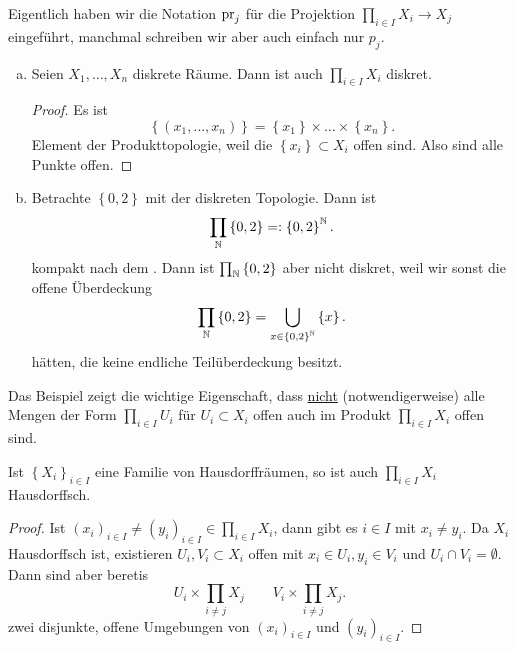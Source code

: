 \begin{remark}
    Eigentlich haben wir die Notation $\operatorname{pr}_j$ für die Projektion  $\prod _{i \in I}X_i \to  X_j$ eingeführt, manchmal schreiben wir aber auch einfach nur $p_j$.
\end{remark}
\begin{example}
    \begin{enumerate}[a)]
        \item Seien $X_1,\ldots,X_n$ diskrete Räume. Dann ist auch $\prod_{i \in I}X_i$ diskret.
            \begin{proof}
                Es ist
                \[
                    \left \{(x_1,\ldots,x_n)\right\}  = \left \{x_1\right\} \times \ldots\times \left \{x_n\right\} 
                .\] 
                Element der Produkttopologie, weil die $\left \{x_i\right\} \subset X_i$ offen sind. Also sind alle Punkte offen.
            \end{proof}
        \item Betrachte $\left \{0,2\right\} $ mit der diskreten Topologie. Dann ist
            \[
            \prod_{\mathbb{N}} \left \{0,2\right\} =: \left \{0,2\right\} ^{\mathbb{N}}
            .\] 
            kompakt nach dem . Dann ist $\prod_{\mathbb{N}} \left \{0,2\right\} $ aber nicht diskret, weil wir sonst die offene Überdeckung
            \[
            \prod_{\mathbb{N}} \left \{0,2\right\} = \bigcup_{x\in \left \{0,2\right\} ^{\mathbb{N}}}  \left \{x\right\} 
            .\] 
            hätten, die keine endliche Teilüberdeckung besitzt.
    \end{enumerate}
\end{example}
\begin{remark*}
    Das Beispiel zeigt die wichtige Eigenschaft, dass \underline{nicht} (notwendigerweise) alle Mengen der Form $\prod_{i \in I}U_i$ für $U_i\subset X_i$ offen auch im Produkt $\prod_{i \in I}X_i$ offen sind.
\end{remark*}

\begin{theorem}\label{thm:produkte-von-Hausdorff-Räumen-sind-Hausdorff}
    Ist $\left \{X_i\right\} _{i \in I}$ eine Familie von Hausdorffräumen, so ist auch  $\prod _{i \in I} X_i$ Hausdorffsch.
\end{theorem}
\begin{proof}
    Ist $(x_i)_{i \in I} \neq  (y_i)_{i \in I} \in  \prod _{i \in I}X_i$, dann gibt es $i\in I$ mit $x_i \neq  y_i$. Da $X_i$ Hausdorffsch ist, existieren  $U_i, V_i \subset X_i$ offen mit $x_i \in U_i, y_i \in V_i$ und $U_i \cap  V_i = \emptyset$. Dann sind aber beretis
    \[
    U_i \times  \prod_{i\neq j} X_j \qquad V_i \times \prod_{i\neq j} X_j
    .\] 
    zwei disjunkte, offene Umgebungen von $(x_i)_{i \in I}$ und $(y_i)_{i \in I}$.
\end{proof}


